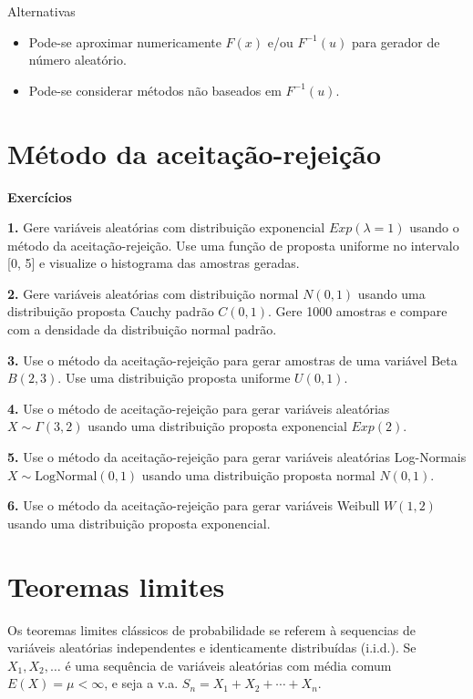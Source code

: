 \documentclass[
]{book}
\begin{document}
Alternativas

\begin{itemize}
\item
  Pode-se aproximar numericamente \(F(x)\) e/ou \(F^{-1}(u)\) para gerador
  de número aleatório.
\item
  Pode-se considerar métodos não baseados em \(F^{-1}(u)\).
\end{itemize}

\chapter{Método da aceitação-rejeição}\label{muxe9todo-da-aceitauxe7uxe3o-rejeiuxe7uxe3o}

\textbf{Exercícios}

\textbf{1.} Gere variáveis aleatórias com distribuição exponencial
\(Exp(\lambda = 1)\) usando o método da aceitação-rejeição. Use uma função
de proposta uniforme no intervalo {[}0, 5{]} e visualize o histograma das
amostras geradas.

\textbf{2.} Gere variáveis aleatórias com distribuição normal \(N(0,1)\) usando
uma distribuição proposta Cauchy padrão \(C(0,1)\). Gere 1000 amostras e
compare com a densidade da distribuição normal padrão.

\textbf{3.} Use o método da aceitação-rejeição para gerar amostras de uma
variável Beta \(B(2, 3)\). Use uma distribuição proposta uniforme
\(U(0, 1)\).

\textbf{4.} Use o método de aceitação-rejeição para gerar variáveis
aleatórias \(X \sim \Gamma(3, 2)\) usando uma distribuição proposta
exponencial \(Exp(2)\).

\textbf{5.} Use o método da aceitação-rejeição para gerar variáveis
aleatórias Log-Normais \(X \sim \text{LogNormal}(0, 1)\) usando uma
distribuição proposta normal \(N(0, 1)\).

\textbf{6.} Use o método da aceitação-rejeição para gerar variáveis Weibull
\(W(1, 2)\) usando uma distribuição proposta exponencial.

\chapter{Teoremas limites}\label{teoremas-limites}

Os teoremas limites clássicos de probabilidade se referem à sequencias de variáveis aleatórias independentes e identicamente distribuídas (i.i.d.). Se \(X_1,X_2,\ldots\) é uma sequência de variáveis aleatórias com média comum \(E(X)=\mu < \infty\), e seja a v.a. \(S_n = X_1 + X_2 + \cdots + X_n\).
\end{document}
